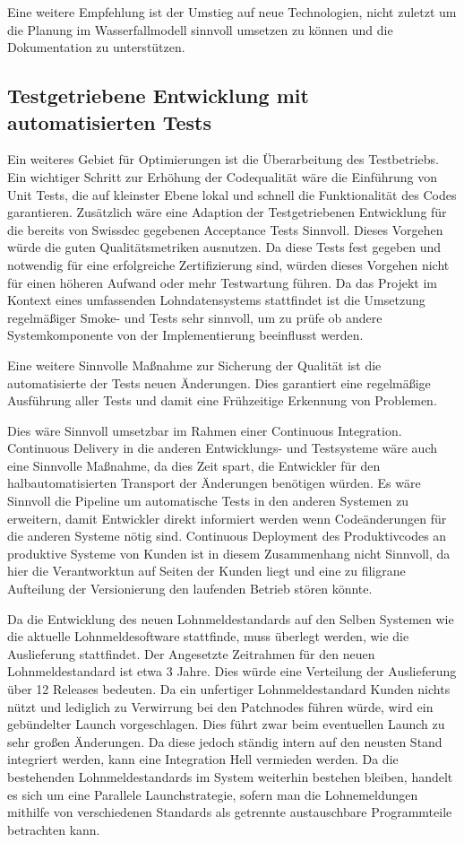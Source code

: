 Eine weitere Empfehlung ist der Umstieg auf neue Technologien, nicht zuletzt um die Planung im Wasserfallmodell sinnvoll umsetzen zu können und die Dokumentation zu unterstützen.


\subsection{Testgetriebene Entwicklung mit automatisierten Tests}

Ein weiteres Gebiet für Optimierungen ist die Überarbeitung des Testbetriebs.
Ein wichtiger Schritt zur Erhöhung der Codequalität wäre die Einführung von Unit Tests, die auf kleinster Ebene lokal und schnell die Funktionalität des Codes garantieren.
Zusätzlich wäre eine Adaption der Testgetriebenen Entwicklung für die bereits von Swissdec gegebenen Acceptance Tests Sinnvoll. Dieses Vorgehen würde die guten Qualitätsmetriken ausnutzen. Da diese Tests fest gegeben und notwendig für eine erfolgreiche Zertifizierung sind, würden dieses Vorgehen nicht für einen höheren Aufwand oder mehr Testwartung führen.
Da das Projekt im Kontext eines umfassenden Lohndatensystems stattfindet ist die Umsetzung regelmäßiger Smoke- und Tests sehr sinnvoll, um zu prüfe ob andere Systemkomponente von der Implementierung beeinflusst werden.

Eine weitere Sinnvolle Maßnahme zur Sicherung der Qualität ist die automatisierte der Tests neuen Änderungen. Dies garantiert eine regelmäßige Ausführung aller Tests und damit eine Frühzeitige Erkennung von Problemen.

Dies wäre Sinnvoll umsetzbar im Rahmen einer Continuous Integration. Continuous Delivery in die anderen Entwicklungs- und Testsysteme wäre auch eine Sinnvolle Maßnahme, da dies Zeit spart, die Entwickler für den halbautomatisierten Transport der Änderungen benötigen würden.
Es wäre Sinnvoll die Pipeline um automatische Tests in den anderen Systemen zu erweitern, damit Entwickler direkt informiert werden wenn Codeänderungen für die anderen Systeme nötig sind.
Continuous Deployment des Produktivcodes an produktive Systeme von Kunden ist in diesem Zusammenhang nicht Sinnvoll, da hier die Verantworktun auf Seiten der Kunden liegt und eine zu filigrane Aufteilung der Versionierung den laufenden Betrieb stören könnte.

Da die Entwicklung des neuen Lohnmeldestandards auf den Selben Systemen wie die aktuelle Lohnmeldesoftware stattfinde, muss überlegt werden, wie die Auslieferung stattfindet.
Der Angesetzte Zeitrahmen für den neuen Lohnmeldestandard ist etwa 3 Jahre. Dies würde eine Verteilung der Auslieferung über 12 Releases bedeuten. Da ein unfertiger Lohnmeldestandard Kunden nichts nützt und lediglich zu Verwirrung bei den Patchnodes führen würde, wird ein gebündelter Launch vorgeschlagen. Dies führt zwar beim eventuellen Launch zu sehr großen Änderungen. Da diese jedoch ständig intern auf den neusten Stand integriert werden, kann eine Integration Hell vermieden werden.
Da die bestehenden Lohnmeldestandards im System weiterhin bestehen bleiben, handelt es sich um eine Parallele Launchstrategie, sofern man die Lohnemeldungen mithilfe von verschiedenen Standards als getrennte austauschbare Programmteile betrachten kann.


